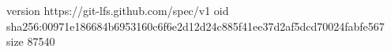 version https://git-lfs.github.com/spec/v1
oid sha256:00971e186684b6953160c6f6e2d12d24c885f41ee37d2af5dcd70024fabfe567
size 87540

